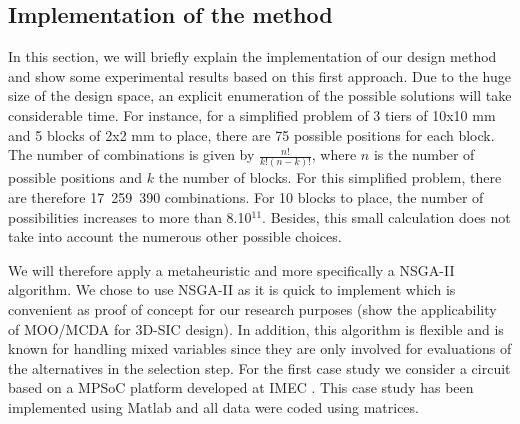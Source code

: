 \subsection{Implementation of the method}
\label{sec:nsgaii-implement}
In this section, we will briefly explain the implementation of our design method and show some experimental results based on this first approach. Due to the huge size of the design space, an explicit enumeration of the possible solutions will take considerable time. For instance, for a simplified problem of 3 tiers of 10x10 mm and 5 blocks of 2x2 mm to place, there are 75 possible positions for each block. The number of combinations is given by $\frac{n!}{k!(n-k)!}$, where $n$ is the number of possible positions and $k$ the number of blocks. For this simplified problem, there are therefore 17~259~390 combinations. For 10 blocks to place, the number of possibilities increases to more than 8.10$^{11}$. Besides, this small calculation does not take into account the numerous other possible choices.

We will therefore apply a metaheuristic and more specifically a NSGA-II algorithm. We chose to use NSGA-II as it is quick to implement which is convenient as proof of concept for our research purposes (show the applicability of MOO/MCDA for 3D-SIC design). In addition, this algorithm is flexible and is known for handling mixed variables since they are only involved for evaluations of the alternatives in the selection step. For the first case study we consider a circuit based on a MPSoC platform developed at IMEC \cite{dmilojev08b}. This case study has been implemented using Matlab and all data were coded using matrices.

